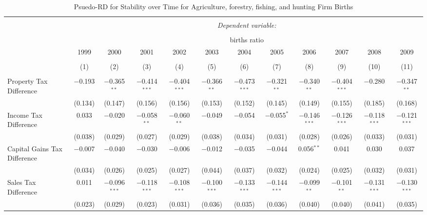 
\begin{table}[!htbp] \centering 
  \caption{Psuedo-RD for Stability over Time for  Agriculture, forestry, fishing, and hunting Firm Births} 
  \label{} 
\begin{tabular}{@{\extracolsep{5pt}}lccccccccccc} 
\\[-1.8ex]\hline 
\hline \\[-1.8ex] 
 & \multicolumn{11}{c}{\textit{Dependent variable:}} \\ 
\cline{2-12} 
\\[-1.8ex] & \multicolumn{11}{c}{births ratio} \\ 
 & 1999 & 2000 & 2001 & 2002 & 2003 & 2004 & 2005 & 2006 & 2007 & 2008 & 2009 \\ 
\\[-1.8ex] & (1) & (2) & (3) & (4) & (5) & (6) & (7) & (8) & (9) & (10) & (11)\\ 
\hline \\[-1.8ex] 
 Property Tax Difference & $-$0.193 & $-$0.365$^{**}$ & $-$0.414$^{***}$ & $-$0.404$^{***}$ & $-$0.366$^{**}$ & $-$0.473$^{***}$ & $-$0.321$^{**}$ & $-$0.340$^{**}$ & $-$0.404$^{***}$ & $-$0.280 & $-$0.347$^{**}$ \\ 
  & (0.134) & (0.147) & (0.156) & (0.156) & (0.153) & (0.152) & (0.145) & (0.149) & (0.155) & (0.185) & (0.168) \\ 
  Income Tax Difference & 0.033 & $-$0.020 & $-$0.058$^{**}$ & $-$0.060$^{**}$ & $-$0.049 & $-$0.054 & $-$0.055$^{*}$ & $-$0.146$^{***}$ & $-$0.126$^{***}$ & $-$0.118$^{***}$ & $-$0.121$^{***}$ \\ 
  & (0.038) & (0.029) & (0.027) & (0.029) & (0.038) & (0.034) & (0.031) & (0.028) & (0.026) & (0.033) & (0.031) \\ 
  Capital Gains Tax Difference & $-$0.007 & $-$0.040 & $-$0.030 & $-$0.006 & $-$0.012 & $-$0.035 & $-$0.044 & 0.056$^{**}$ & 0.041 & 0.030 & 0.037 \\ 
  & (0.034) & (0.026) & (0.025) & (0.027) & (0.044) & (0.037) & (0.032) & (0.024) & (0.025) & (0.032) & (0.031) \\ 
  Sales Tax Difference & 0.011 & $-$0.096$^{***}$ & $-$0.118$^{***}$ & $-$0.108$^{***}$ & $-$0.100$^{***}$ & $-$0.133$^{***}$ & $-$0.144$^{***}$ & $-$0.099$^{**}$ & $-$0.101$^{**}$ & $-$0.131$^{***}$ & $-$0.130$^{***}$ \\ 
  & (0.023) & (0.029) & (0.023) & (0.031) & (0.036) & (0.035) & (0.036) & (0.040) & (0.040) & (0.041) & (0.035) \\ 

\end{tabular}
\end{table}
